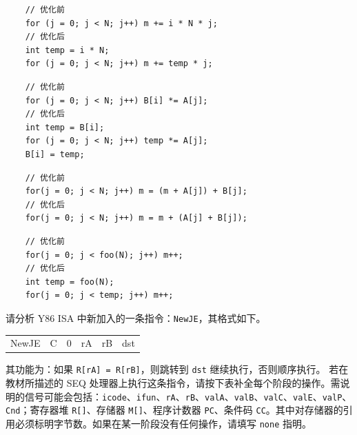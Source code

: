 \begin{problems}
        \vspace{\baselineskip}
        \begin{choices}
            \item \begin{verbatim}
    // 优化前
    for (j = 0; j < N; j++) m += i * N * j;
    // 优化后
    int temp = i * N;
    for (j = 0; j < N; j++) m += temp * j;
            \end{verbatim}
            \item \begin{verbatim}
    // 优化前
    for (j = 0; j < N; j++) B[i] *= A[j];
    // 优化后
    int temp = B[i];
    for (j = 0; j < N; j++) temp *= A[j];
    B[i] = temp;
            \end{verbatim}
            \item \begin{verbatim}
    // 优化前
    for(j = 0; j < N; j++) m = (m + A[j]) + B[j];
    // 优化后
    for(j = 0; j < N; j++) m = m + (A[j] + B[j]);
            \end{verbatim}
            \item \begin{verbatim}
    // 优化前
    for(j = 0; j < foo(N); j++) m++;
    // 优化后
    int temp = foo(N);
    for(j = 0; j < temp; j++) m++;
            \end{verbatim}
        \end{choices}
         请分析 Y86 ISA 中新加入的一条指令：\verb|NewJE|，其格式如下。
        \begin{table}[H]
            \centering
            \begin{tabular}{c|c|c|c|c|c|}
                \cline{2-6}
                NewJE & C & 0 & rA & rB & dst \\ \cline{2-6} 
            \end{tabular}
        \end{table}
        其功能为：如果 \verb|R[rA] = R[rB]|，则跳转到 \verb|dst| 继续执行，否则顺序执行。
        \qn 若在教材所描述的 SEQ 处理器上执行这条指令，请按下表补全每个阶段的操作。需说明的信号可能会包括：\verb|icode|、\verb|ifun|、\verb|rA|、\verb|rB|、\verb|valA|、\verb|valB|、\verb|valC|、\verb|valE|、\verb|valP|、\verb|Cnd|；寄存器堆 \verb|R[]|、存储器 \verb|M[]|、程序计数器 \verb|PC|、条件码 \verb|CC|。其中对存储器的引用必须标明字节数。如果在某一阶段没有任何操作，请填写 \texttt{none} 指明。
        \begin{table}[H]

\end{table}
\end{problems}
